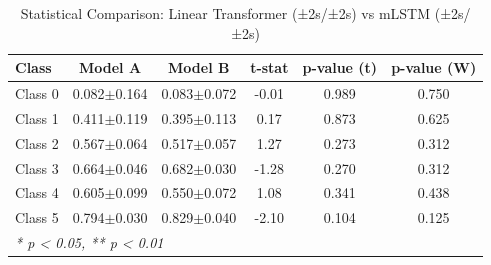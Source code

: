\begin{table}[htbp]
\centering
\caption{Statistical Comparison: Linear Transformer (±2s/±2s) vs mLSTM (±2s/±2s)}
\label{tab:comparison_class_linear_transformer_±2s_±2s_vs_mlstm_±2s_±2s}
\begin{tabular}{lccccc}
\toprule
\textbf{Class} & \textbf{Model A} & \textbf{Model B} & \textbf{t-stat} & \textbf{p-value (t)} & \textbf{p-value (W)} \\
\midrule
Class 0 & 0.082$\pm$0.164 & 0.083$\pm$0.072 & -0.01 & 0.989 & 0.750 \\
Class 1 & 0.411$\pm$0.119 & 0.395$\pm$0.113 & 0.17 & 0.873 & 0.625 \\
Class 2 & 0.567$\pm$0.064 & 0.517$\pm$0.057 & 1.27 & 0.273 & 0.312 \\
Class 3 & 0.664$\pm$0.046 & 0.682$\pm$0.030 & -1.28 & 0.270 & 0.312 \\
Class 4 & 0.605$\pm$0.099 & 0.550$\pm$0.072 & 1.08 & 0.341 & 0.438 \\
Class 5 & 0.794$\pm$0.030 & 0.829$\pm$0.040 & -2.10 & 0.104 & 0.125 \\
\bottomrule
\multicolumn{6}{l}{\textit{* p < 0.05, ** p < 0.01}} \\
\end{tabular}
\end{table}